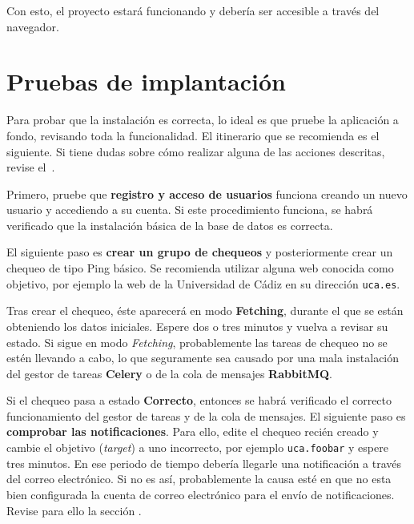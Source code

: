 
Con esto, el proyecto estará funcionando y debería ser accesible a través del
navegador.

\section{Pruebas de implantación}

Para probar que la instalación es correcta, lo ideal es que pruebe la aplicación
a fondo, revisando toda la funcionalidad. El itinerario que se recomienda es el
siguiente. Si tiene dudas sobre cómo realizar alguna de las acciones descritas,
revise el~.

Primero, pruebe que \textbf{registro y acceso de usuarios} funciona creando un
nuevo usuario y accediendo a su cuenta. Si este procedimiento funciona, se habrá
verificado que la instalación básica de la base de datos es correcta.

El siguiente paso es \textbf{crear un grupo de chequeos} y posteriormente crear
un chequeo de tipo Ping básico. Se recomienda utilizar alguna web conocida como
objetivo, por ejemplo la web de la Universidad de Cádiz en su dirección
\texttt{uca.es}.

Tras crear el chequeo, éste aparecerá en modo \textbf{Fetching}, durante el
que se están obteniendo los datos iniciales. Espere dos o tres minutos y vuelva
a revisar su estado. Si sigue en modo \textit{Fetching}, probablemente las
tareas de chequeo no se estén llevando a cabo, lo que seguramente sea causado
por una mala instalación del gestor de tareas \textbf{Celery} o de la cola de
mensajes \textbf{RabbitMQ}. 

Si el chequeo pasa a estado \textbf{Correcto}, entonces se habrá verificado el
correcto funcionamiento del gestor de tareas y de la cola de mensajes. El
siguiente paso es \textbf{comprobar las notificaciones}. Para ello, edite el
chequeo recién creado y cambie el objetivo (\textit{target}) a uno incorrecto,
por ejemplo \texttt{uca.foobar} y espere tres minutos. En ese periodo de tiempo
debería llegarle una notificación a través del correo electrónico. Si no es así,
probablemente la causa esté en que no esta bien configurada la cuenta de correo
electrónico para el envío de notificaciones. Revise para ello la sección
\textit{}.

